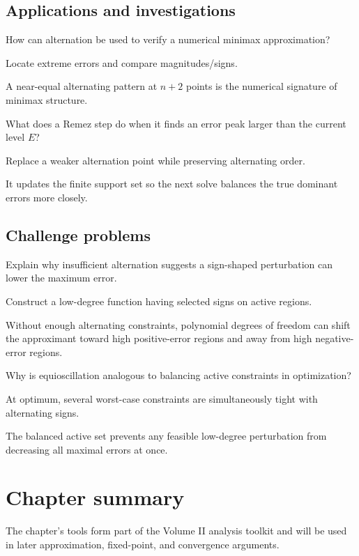 \subsection*{Applications and investigations}

\begin{exercise}\label{exr:ii23-expand-13}
How can alternation be used to verify a numerical minimax approximation?
\end{exercise}
\begin{hint}
Locate extreme errors and compare magnitudes/signs.
\end{hint}
\begin{solution}
A near-equal alternating pattern at \(n+2\) points is the numerical signature of minimax structure.
\end{solution}

\begin{exercise}\label{exr:ii23-expand-14}
What does a Remez step do when it finds an error peak larger than the current level \(E\)?
\end{exercise}
\begin{hint}
Replace a weaker alternation point while preserving alternating order.
\end{hint}
\begin{solution}
It updates the finite support set so the next solve balances the true dominant errors more closely.
\end{solution}

\subsection*{Challenge problems}

\begin{exercise}\label{exr:ii23-expand-15}
Explain why insufficient alternation suggests a sign-shaped perturbation can lower the maximum error.
\end{exercise}
\begin{hint}
Construct a low-degree function having selected signs on active regions.
\end{hint}
\begin{solution}
Without enough alternating constraints, polynomial degrees of freedom can shift the approximant toward high positive-error regions and away from high negative-error regions.
\end{solution}

\begin{exercise}\label{exr:ii23-expand-16}
Why is equioscillation analogous to balancing active constraints in optimization?
\end{exercise}
\begin{hint}
At optimum, several worst-case constraints are simultaneously tight with alternating signs.
\end{hint}
\begin{solution}
The balanced active set prevents any feasible low-degree perturbation from decreasing all maximal errors at once.
\end{solution}
\section*{Chapter summary}
The chapter's tools form part of the Volume II analysis toolkit and will be used in later approximation, fixed-point, and convergence arguments.
